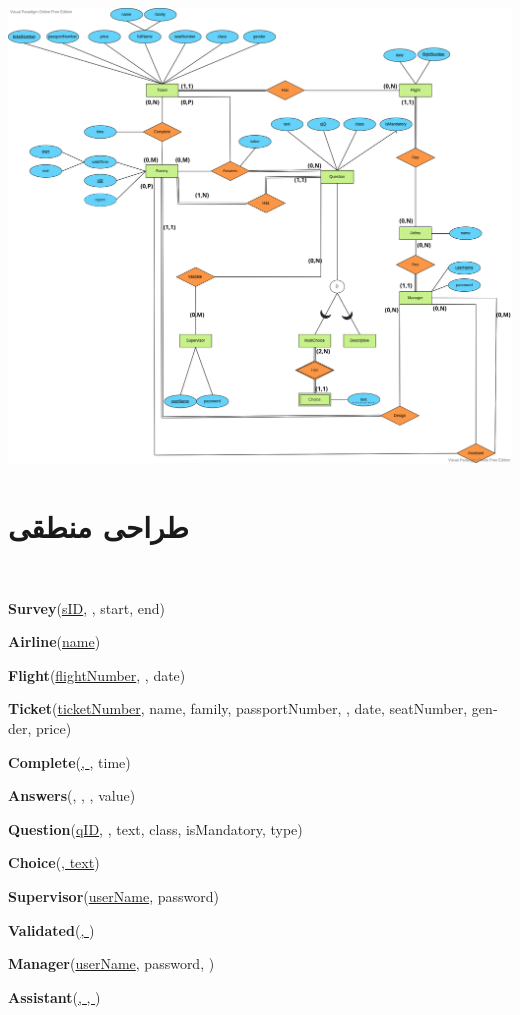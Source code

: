 \documentclass[a4paper,12pt]{article}
\begin{document}
\begin{center}
	\includegraphics[scale=0.3]{ERD.png}
\end{center}

\section*{طراحی منطقی}

\begin{latin}
\

\textbf{Survey}(\underline{sID}, , start, end)
\smallskip

\textbf{Airline}(\underline{name})
\smallskip

\textbf{Flight}(\underline{flightNumber}, , date)
\smallskip

\textbf{Ticket}(\underline{ticketNumber}, name, family, passportNumber, , date, seatNumber, gender, price)
\smallskip

\textbf{Complete}(\underline{, }, time)
\smallskip

\textbf{Answers}(, , , value)
\smallskip

\textbf{Question}(\underline{qID}, , text, class, isMandatory, type)
\smallskip

\textbf{Choice}(\underline{, text})
\smallskip

\textbf{Supervisor}(\underline{userName}, password)
\smallskip

\textbf{Validated}(\underline{, })
\smallskip

\textbf{Manager}(\underline{userName}, password, )
\smallskip

\textbf{Assistant}(\underline{, , })
\smallskip

\end{latin}
\end{document}
